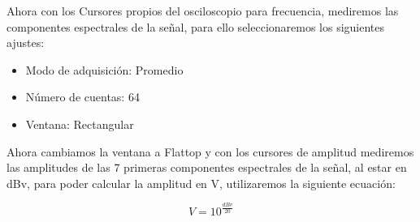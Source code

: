 Ahora con los Cursores propios del osciloscopio para frecuencia, mediremos las componentes espectrales de la señal, para ello seleccionaremos los siguientes ajustes:

\begin{itemize}
    \item Modo de adquisición: Promedio
    \item Número de cuentas: 64
    \item Ventana: Rectangular
\end{itemize}


\begin{table}[H]
\caption{Frecuencia de las primeras siete componentes espectrales de la señal cuadrada.}
\end{table}

Ahora cambiamos la ventana a Flattop y con los cursores de amplitud mediremos las amplitudes de las 7 primeras componentes espectrales de la señal, al estar en dBv, para poder calcular la amplitud en V, utilizaremos la siguiente ecuación:

\begin{equation*}
    V = 10^{\frac{dBv}{20}}
\end{equation*}

\begin{table}[H]
\caption{Amplitud de las primeras siete componentes espectrales de la señal cuadrada.}
\end{table}

